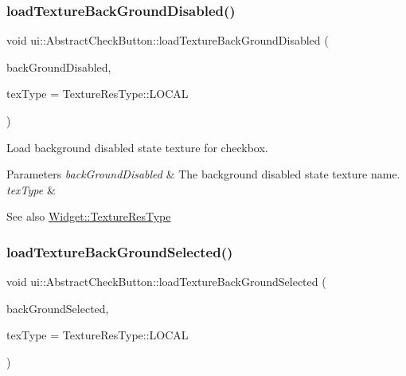 \subsubsection{\texorpdfstring{load\+Texture\+Back\+Ground\+Disabled()}{loadTextureBackGroundDisabled()}\hspace{0.1cm}{\footnotesize\ttfamily [2/2]}}
{\footnotesize\ttfamily void ui\+::\+Abstract\+Check\+Button\+::load\+Texture\+Back\+Ground\+Disabled (\begin{DoxyParamCaption}\item[{const std\+::string \&}]{back\+Ground\+Disabled,  }\item[{\hyperlink{classui_1_1Widget_a040a65ec5ad3b11119b7e16b98bd9af0}{Texture\+Res\+Type}}]{tex\+Type = {\ttfamily TextureResType\+:\+:LOCAL} }\end{DoxyParamCaption})}

Load background disabled state texture for checkbox.


\begin{DoxyParams}{Parameters}
{\em back\+Ground\+Disabled} & The background disabled state texture name.\\
\hline
{\em tex\+Type} & \\
\hline
\end{DoxyParams}
\begin{DoxySeeAlso}{See also}
{\ttfamily \hyperlink{classui_1_1Widget_a040a65ec5ad3b11119b7e16b98bd9af0}{Widget\+::\+Texture\+Res\+Type}} 
\end{DoxySeeAlso}
\mbox{\label{classui_1_1AbstractCheckButton_a060437afe2b6064928901d4839b2c5dc}} 
\subsubsection{\texorpdfstring{load\+Texture\+Back\+Ground\+Selected()}{loadTextureBackGroundSelected()}\hspace{0.1cm}{\footnotesize\ttfamily [1/2]}}
{\footnotesize\ttfamily void ui\+::\+Abstract\+Check\+Button\+::load\+Texture\+Back\+Ground\+Selected (\begin{DoxyParamCaption}\item[{const std\+::string \&}]{back\+Ground\+Selected,  }\item[{\hyperlink{classui_1_1Widget_a040a65ec5ad3b11119b7e16b98bd9af0}{Texture\+Res\+Type}}]{tex\+Type = {\ttfamily TextureResType\+:\+:LOCAL} }\end{DoxyParamCaption})}

